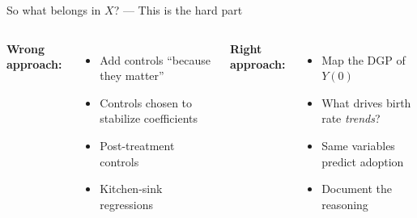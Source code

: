 \documentclass[aspectratio=169,12pt]{beamer}
\begin{document}
\begin{frame}{So what belongs in $X$? --- This is the hard part}


\vspace{0.4em}
\begin{columns}[t]
  \textbf{\color{ArnoBlue}Wrong approach:}
  \begin{itemize}\small\setlength{\itemsep}{1pt}
    \item Add controls ``because they matter''
    \item Controls chosen to stabilize coefficients
    \item Post-treatment controls
    \item Kitchen-sink regressions
  \end{itemize}
  \textbf{\color{CypressGreen}Right approach:}
  \begin{itemize}\small\setlength{\itemsep}{1pt}
    \item Map the DGP of $Y(0)$
    \item What drives birth rate \emph{trends}?
    \item Same variables predict adoption
    \item Document the reasoning
  \end{itemize}
\end{columns}

\end{frame}

\end{document}
